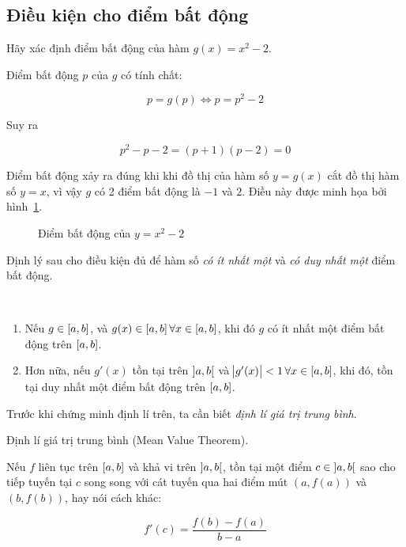 \documentclass[../../Lectures.tex]{subfiles}
\begin{document}
\subsection{Điều kiện cho điểm bất động}

\begin{exmp}
    Hãy xác định điểm bất động của hàm \(g(x) = x^2 - 2\).

    Điểm bất động \(p\) của \(g\) có tính chất:

    \[p= g(p) \iff p = p^2 - 2\]

    Suy ra

    \[p^2 - p - 2 = (p + 1)(p - 2) = 0\]

    Điểm bất động xảy ra đúng khi khi đồ thị của hàm số \(y = g(x)\) cắt đồ thị
    hàm số \(y = x\), vì vậy \(g\) có 2 điểm bất động là \(-1\) và \(2\). Điều
    này được minh họa bởi hình~\ref{fig:exmp_2.2_fixed_point}.

    \begin{figure}[!h]
        \centering
        
        \caption{Điểm bất động của \(y = x^2 - 2\)}
        \label{fig:exmp_2.2_fixed_point}
    \end{figure}
\end{exmp}

Định lý sau cho điều kiện đủ để hàm số \emph{có ít nhất một} và \emph{có duy
nhất một} điểm bất động.

\begin{theorem}\label{thm:sufficient_conditions_of_fixed_point}
\phantom\\
\begin{enumerate}
    \item Nếu \(g \in \interval{a}{b}\), và \(g(x) \in \interval{a}{b} \,
        \forall x \in \interval{a}{b}\), khi đó \(g\) có ít nhất một điểm bất
        động trên \(\interval{a}{b}\).
    \item Hơn nữa, nếu \(g'(x)\) tồn tại trên \(\interval[open]{a}{b}\) và
        \(\abs{g'(x)} < 1 \, \forall x \in \interval{a}{b}\), khi đó, tồn tại
        duy nhất một điểm bất động trên \(\interval{a}{b}\).
\end{enumerate}
\end{theorem}

Trước khi chứng minh định lí trên, ta cần biết \emph{định lí giá trị trung
bình}.

\begin{theorem}\label{thm:mean_value_theorem}
    Định lí giá trị trung bình (Mean Value Theorem).

    Nếu \(f\) liên tục trên \(\interval{a}{b}\) và khả vi trên
    \(\interval[open]{a}{b}\), tồn tại một điểm \(c \in \interval[open]{a}{b}\)
    sao cho tiếp tuyến tại \(c\) song song với cát tuyến qua hai điểm mút \((a,
    f(a))\) và \((b, f(b))\), hay nói cách khác:

    \[f'(c) = \frac{f(b) - f(a)}{b - a}\]
\end{theorem}
\end{document}
